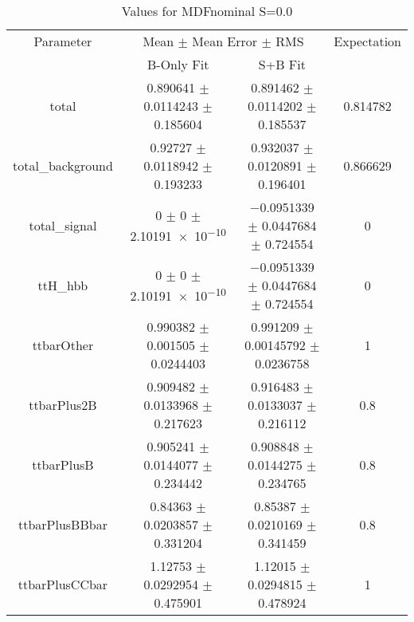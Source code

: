 \begin{table}
\centering
\caption{Values for MDFnominal S=0.0}
\begin{tabular}{cccc}
\toprule
Parameter & \multicolumn{2}{c}{Mean $\pm$ Mean Error $\pm$ RMS} & Expectation\\
 & B-Only Fit & S+B Fit & \\
\midrule
total & \num{0.890641} $\pm$ \num{0.0114243} $\pm$ \num{0.185604} & \num{0.891462} $\pm$ \num{0.0114202} $\pm$ \num{0.185537} & \num{0.814782}\\
total\_background & \num{0.92727} $\pm$ \num{0.0118942} $\pm$ \num{0.193233} & \num{0.932037} $\pm$ \num{0.0120891} $\pm$ \num{0.196401} & \num{0.866629}\\
total\_signal & \num{0} $\pm$ \num{0} $\pm$ \num{2.10191e-10} & \num{-0.0951339} $\pm$ \num{0.0447684} $\pm$ \num{0.724554} & \num{0}\\
ttH\_hbb & \num{0} $\pm$ \num{0} $\pm$ \num{2.10191e-10} & \num{-0.0951339} $\pm$ \num{0.0447684} $\pm$ \num{0.724554} & \num{0}\\
ttbarOther & \num{0.990382} $\pm$ \num{0.001505} $\pm$ \num{0.0244403} & \num{0.991209} $\pm$ \num{0.00145792} $\pm$ \num{0.0236758} & \num{1}\\
ttbarPlus2B & \num{0.909482} $\pm$ \num{0.0133968} $\pm$ \num{0.217623} & \num{0.916483} $\pm$ \num{0.0133037} $\pm$ \num{0.216112} & \num{0.8}\\
ttbarPlusB & \num{0.905241} $\pm$ \num{0.0144077} $\pm$ \num{0.234442} & \num{0.908848} $\pm$ \num{0.0144275} $\pm$ \num{0.234765} & \num{0.8}\\
ttbarPlusBBbar & \num{0.84363} $\pm$ \num{0.0203857} $\pm$ \num{0.331204} & \num{0.85387} $\pm$ \num{0.0210169} $\pm$ \num{0.341459} & \num{0.8}\\
ttbarPlusCCbar & \num{1.12753} $\pm$ \num{0.0292954} $\pm$ \num{0.475901} & \num{1.12015} $\pm$ \num{0.0294815} $\pm$ \num{0.478924} & \num{1}\\
\bottomrule
\end{tabular}
\end{table}